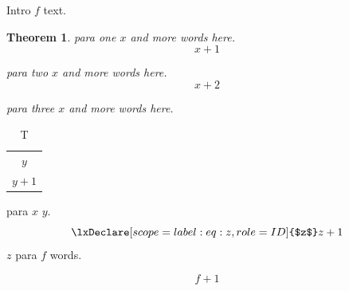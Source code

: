 \documentclass{article}
\newtheorem{thm}{Theorem}
\begin{document}
\label{sec:intro}
%
Intro $f$ text.
\begin{thm}\label{thm:a}
%
para one $x$ and more words here.
\begin{equation} x+1 \end{equation}

para two $x$ and more words here.
\begin{equation} x+2 \end{equation}

para three $x$ and more words here.
\end{thm}
\begin{table}\caption{T}\label{tab:a}
%
\begin{tabular}{c}$y$\\ $y+1$\end{tabular}
\end{table}
para $x$ $y$.
\begin{equation}\label{eq:z}\lxDeclare[scope=label:eq:z,role=ID]{$z$} z+1 \end{equation}
$z$
para $f$ words.

\begin{equation} f+1 \end{equation}
\end{document}
